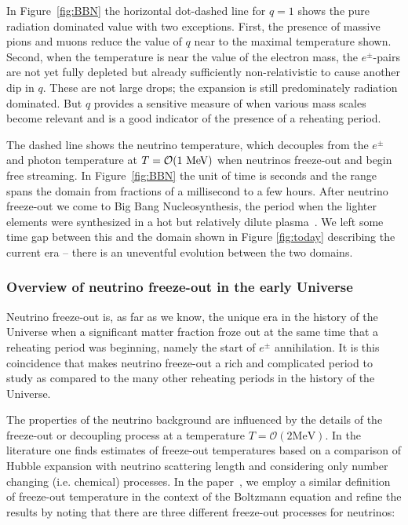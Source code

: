  In Figure~\ref{fig:BBN} the horizontal dot-dashed line for $q=1$ shows the pure radiation dominated value with two exceptions. First, the presence of massive pions and muons reduce the value of $q$ near to the maximal temperature shown. Second, when the temperature is near the value of the electron mass, the $e^\pm$-pairs are not yet fully depleted but already sufficiently non-relativistic to cause another dip in $q$. These are not large drops; the expansion is still predominately radiation dominated. But $q$ provides a sensitive measure of when various mass scales become relevant and is a good indicator of the presence of a reheating period.

 The dashed line shows the neutrino temperature, which decouples from the $e^\pm$ and photon temperature at $T={\cal O}(1\MeV)$ when neutrinos freeze-out and begin free streaming. In Figure~\ref{fig:BBN} the unit of time is seconds and the range spans the domain from fractions of a millisecond to a few hours. After neutrino freeze-out we come to Big Bang Nucleosynthesis, the period when the lighter elements were synthesized in a hot but relatively dilute plasma~\cite{Iocco:2008va}. We left some time gap between this and the domain shown in Figure \ref{fig:today} describing the current era -- there is an uneventful evolution between the two domains. 
 


\subsubsection{Overview of neutrino freeze-out in the early Universe}
 Neutrino freeze-out is, as far as we know, the unique era in the history of the Universe when a significant matter fraction froze out at the same time that a reheating period was beginning, namely the start of $e^\pm$ annihilation. It is this coincidence that makes neutrino freeze-out a rich and complicated period to study as compared to the many other reheating periods in the history of the Universe. 

The properties of the neutrino background are influenced by the details of the freeze-out or decoupling process at a temperature $T=\mathcal{O}(2\mathrm{MeV})$. In the literature one finds estimates of freeze-out temperatures based on a comparison of Hubble expansion with neutrino scattering length and considering only number changing (i.e. chemical) processes. In the paper~\cite{Birrell:2014uka}, we employ a similar definition of freeze-out temperature in the context of the Boltzmann equation and refine the results by noting that there are three different freeze-out processes for neutrinos:

